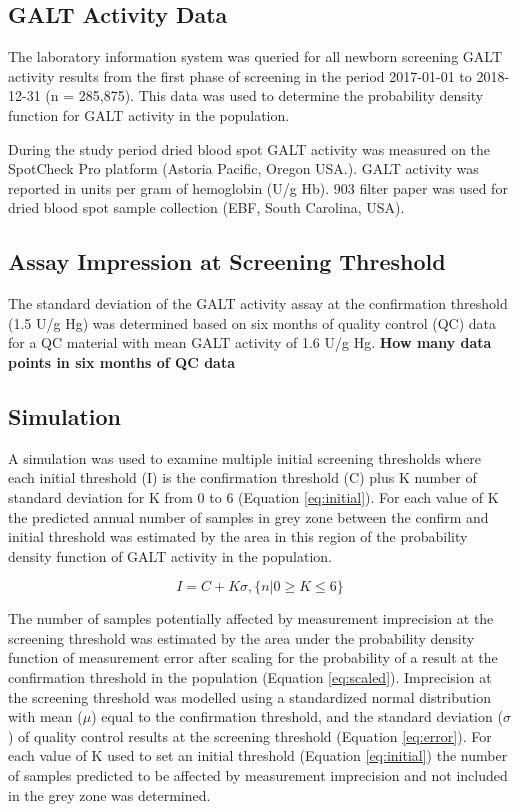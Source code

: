 \documentclass[review]{elsarticle}
\begin{document}
\subsection*{GALT Activity Data}
\label{sec:org7270fd0}
The laboratory information system was queried for all newborn
screening GALT activity results from the first phase of screening in
the period 2017-01-01 to 2018-12-31 (n = 285,875). This data was used
to determine the probability density function for GALT activity in the
population.

During the study period dried blood spot GALT activity was measured
on the SpotCheck Pro platform (Astoria Pacific, Oregon USA.). GALT
activity was reported in units per gram of hemoglobin (U/g Hb). 903
filter paper was used for dried blood spot sample collection (EBF,
South Carolina, USA).

\subsection*{Assay Impression at Screening Threshold}
\label{sec:org12b910c}
The standard deviation of the GALT activity assay at the confirmation
threshold (1.5 U/g Hg) was determined based on six months of quality
control (QC) data for a QC material with mean GALT activity of 1.6 U/g
Hg.  \textbf{How many data points in six months of QC data}

\subsection*{Simulation}
\label{sec:org9128cdd}
A simulation was used to examine multiple initial screening thresholds
where each initial threshold (I) is the confirmation threshold (C)
plus K number of standard deviation for K from 0 to 6 (Equation
\ref{eq:initial}). For each value of K the predicted annual number of
samples in grey zone between the confirm and initial threshold was
estimated by the area in this region of the probability density
function of GALT activity in the population.

\begin{equation}\label{eq:initial}
I = C + K\sigma , \{n|0\ge K\le6\} 
\end{equation}

The number of samples potentially affected by measurement imprecision
at the screening threshold was estimated by the area under the
probability density function of measurement error after scaling for
the probability of a result at the confirmation threshold in the
population (Equation \ref{eq:scaled}). Imprecision at the screening
threshold was modelled using a standardized normal distribution with
mean (\(\mu\)) equal to the confirmation threshold, and the standard
deviation (\(\sigma\)) of quality control results at the screening
threshold (Equation \ref{eq:error}). For each value of K used to set
an initial threshold (Equation \ref{eq:initial}) the number of samples
predicted to be affected by measurement imprecision and not included
in the grey zone was determined.
\end{document}
